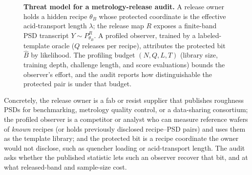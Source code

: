 \documentclass[11pt]{article}
\begin{document}
\begin{figure}[htbp]
\centering

\caption{\textbf{Threat model for a metrology-release audit.} A release owner holds a hidden recipe \(\theta_B\) whose protected coordinate is the effective acid-transport length \(\lambda\); the release map \(R\) exposes a finite-band PSD transcript \(Y\sim P_{\theta_B}^{R}\). A profiled observer, trained by a labeled-template oracle (\(Q\) releases per recipe), attributes the protected bit \(\widehat B\) by likelihood. The profiling budget \((N,Q,L,T)\) (library size, training depth, challenge length, and score evaluations) bounds the observer's effort, and the audit reports how distinguishable the protected pair is under that budget.}
\label{fig:threat-model}
\end{figure}

Concretely, the release owner is a fab or resist supplier that publishes roughness PSDs for benchmarking, metrology quality control, or a data-sharing consortium; the profiled observer is a competitor or analyst who can measure reference wafers of \emph{known} recipes (or holds previously disclosed recipe--PSD pairs) and uses them as the template library; and the protected bit is a recipe coordinate the owner would not disclose, such as quencher loading or acid-transport length. The audit asks whether the published statistic lets such an observer recover that bit, and at what released-band and sample-size cost.
\end{document}
